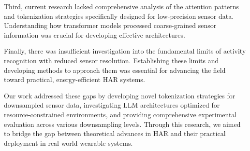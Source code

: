 Third, current research lacked comprehensive analysis of the attention patterns and tokenization strategies specifically designed for low-precision sensor data. Understanding how transformer models processed coarse-grained sensor information was crucial for developing effective architectures.

Finally, there was insufficient investigation into the fundamental limits of activity recognition with reduced sensor resolution. Establishing these limits and developing methods to approach them was essential for advancing the field toward practical, energy-efficient HAR systems.

Our work addressed these gaps by developing novel tokenization strategies for downsampled sensor data, investigating LLM architectures optimized for resource-constrained environments, and providing comprehensive experimental evaluation across various downsampling levels. Through this research, we aimed to bridge the gap between theoretical advances in HAR and their practical deployment in real-world wearable systems.
